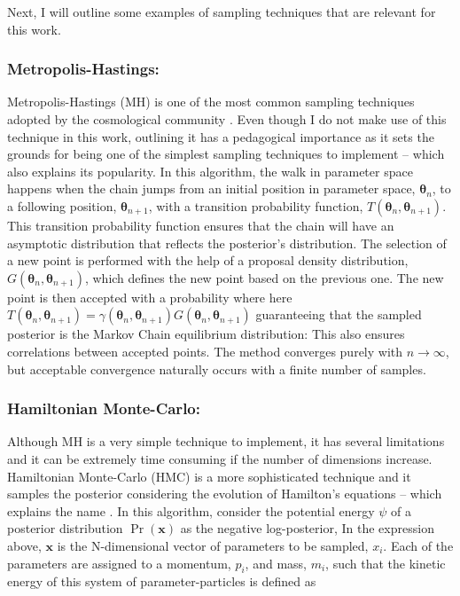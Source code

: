 \qquad Next, I will outline some examples of sampling techniques that are relevant for this work.

\subsubsection{Metropolis-Hastings:}
Metropolis-Hastings (MH) is one of the most common sampling techniques adopted by the cosmological community \citep{2002CosmoMC}. Even though I do not make use of this technique in this work, outlining it has a pedagogical importance as it sets the grounds for being one of the simplest sampling techniques to implement -- which also explains its popularity. In this algorithm, the walk in parameter space happens when the chain jumps from an initial position in parameter space, $\bm{\theta}_n$, to a following position, $\bm{\theta}_{n+1}$, with a transition probability function, $T(\bm{\theta}_n,\bm{\theta}_{n+1})$. This transition probability function ensures that the chain will have an asymptotic distribution that reflects the posterior's distribution. The selection of a new point is performed with the help of a proposal density distribution, $G(\bm{\theta}_n, \bm{\theta}_{n+1})$, which defines the new point based on the previous one. The new point is then accepted with a probability
where here $T(\bm{\theta}_n,\bm{\theta}_{n+1}) = \gamma(\bm{\theta}_n, \bm{\theta}_{n+1})G(\bm{\theta}_n, \bm{\theta}_{n+1})$ guaranteeing that the sampled posterior is the Markov Chain equilibrium distribution:
This also ensures correlations between accepted points. The method converges purely with $n\rightarrow \infty$, but acceptable convergence naturally occurs with a finite number of samples.

\subsubsection{Hamiltonian Monte-Carlo:}
Although MH is a very simple technique to implement, it has several limitations and it can be extremely time consuming if the number of dimensions increase. Hamiltonian Monte-Carlo (HMC) is a more sophisticated technique and it samples the posterior considering the evolution of Hamilton's equations -- which explains the name \citep{Taylor2008}. In this algorithm, consider the potential energy $\psi$ of a posterior distribution $\Pr(\bm{x})$ as the negative log-posterior,
In the expression above, $\bm{x}$ is the N-dimensional vector of parameters to be sampled, $x_i$. Each of the parameters are assigned to a momentum, $p_i$, and mass, $m_i$, such that the kinetic energy of this system of parameter-particles is defined as

